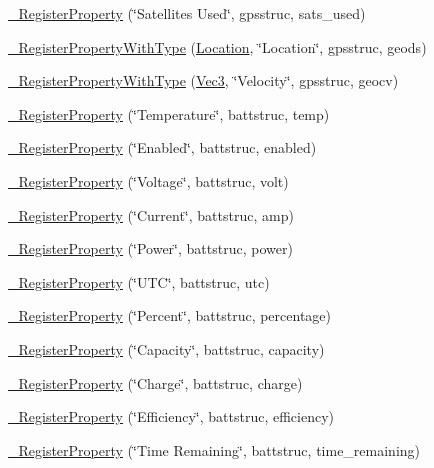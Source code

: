 \begin{DoxyCompactItemize}
\hyperlink{namespacecubesat_aeaa026b90b46862e6611d2cf6f4c4150}{\+\_\+\+Register\+Property} (\char`\"{}Satellites Used\char`\"{}, gpsstruc, sats\+\_\+used)
\item 
\hyperlink{namespacecubesat_ae881f3e127be104ce791ef946529211b}{\+\_\+\+Register\+Property\+With\+Type} (\hyperlink{structcubesat_1_1Location}{Location}, \char`\"{}Location\char`\"{}, gpsstruc, geods)
\item 
\hyperlink{namespacecubesat_a71c1f96727249243c284337421b58dac}{\+\_\+\+Register\+Property\+With\+Type} (\hyperlink{structcubesat_1_1Vec3}{Vec3}, \char`\"{}Velocity\char`\"{}, gpsstruc, geocv)
\item 
\hyperlink{namespacecubesat_ad3c5eaa4901d52c82f9539d0bd6345f2}{\+\_\+\+Register\+Property} (\char`\"{}Temperature\char`\"{}, battstruc, temp)
\item 
\hyperlink{namespacecubesat_ae0ae4077ebcaf0a368c29d6ba5d9c758}{\+\_\+\+Register\+Property} (\char`\"{}Enabled\char`\"{}, battstruc, enabled)
\item 
\hyperlink{namespacecubesat_a7045a5f00d8b74c53a85f4fcabf955fa}{\+\_\+\+Register\+Property} (\char`\"{}Voltage\char`\"{}, battstruc, volt)
\item 
\hyperlink{namespacecubesat_a6038ebb76a70bbecbc364f744798e6a5}{\+\_\+\+Register\+Property} (\char`\"{}Current\char`\"{}, battstruc, amp)
\item 
\hyperlink{namespacecubesat_a1f40f2d2ece3ed4d36645d22e304a5d8}{\+\_\+\+Register\+Property} (\char`\"{}Power\char`\"{}, battstruc, power)
\item 
\hyperlink{namespacecubesat_a2b8886528da9c9ef1188184de26416b3}{\+\_\+\+Register\+Property} (\char`\"{}U\+TC\char`\"{}, battstruc, utc)
\item 
\hyperlink{namespacecubesat_a0f66108b1109813b274401d287dc2b44}{\+\_\+\+Register\+Property} (\char`\"{}Percent\char`\"{}, battstruc, percentage)
\item 
\hyperlink{namespacecubesat_a99d534593c079c64c9ee3f0ff8ede01a}{\+\_\+\+Register\+Property} (\char`\"{}Capacity\char`\"{}, battstruc, capacity)
\item 
\hyperlink{namespacecubesat_adb2f317d40876206a742637b47177b16}{\+\_\+\+Register\+Property} (\char`\"{}Charge\char`\"{}, battstruc, charge)
\item 
\hyperlink{namespacecubesat_a7911f554d445e859b10ffedffd4a0559}{\+\_\+\+Register\+Property} (\char`\"{}Efficiency\char`\"{}, battstruc, efficiency)
\item 
\hyperlink{namespacecubesat_a775c2d719346b2f2a5930bcca3de404b}{\+\_\+\+Register\+Property} (\char`\"{}Time Remaining\char`\"{}, battstruc, time\+\_\+remaining)

\end{DoxyCompactItemize}

